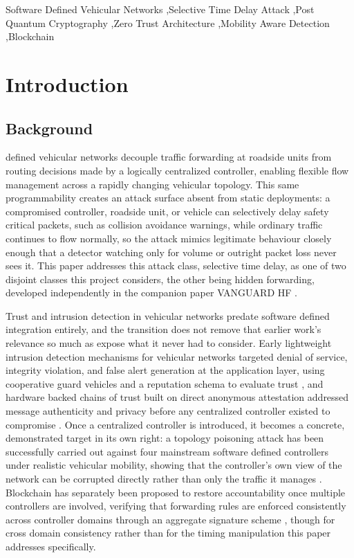 \documentclass[final,5p,twocolumn]{elsarticle}
\theoremstyle{remark}
\theoremstyle{plain}
\begin{document}
\begin{frontmatter}
\begin{keyword}
	Software Defined Vehicular Networks \sep Selective Time Delay Attack \sep Post Quantum Cryptography \sep Zero Trust Architecture \sep Mobility Aware Detection \sep Blockchain
\end{keyword}

\end{frontmatter}

\section{Introduction}\label{introduction}

\subsection{Background}

 defined vehicular networks decouple traffic forwarding at
roadside units from routing decisions made by a logically centralized
controller, enabling flexible flow management across a rapidly changing
vehicular topology. This same programmability creates an attack surface
absent from static deployments: a compromised controller, roadside unit,
or vehicle can selectively delay safety critical packets, such as
collision avoidance warnings, while ordinary traffic continues to flow
normally, so the attack mimics legitimate behaviour closely enough that a
detector watching only for volume or outright packet loss never sees it.
This paper addresses this attack class, selective time delay, as one of
two disjoint classes this project considers, the other being hidden
forwarding, developed independently in the companion paper VANGUARD HF
\cite{VanguardHF2026}.

Trust and intrusion detection in vehicular networks predate software
defined integration entirely, and the transition does not remove that
earlier work's relevance so much as expose what it never had to consider.
Early lightweight intrusion detection mechanisms for vehicular networks
targeted denial of service, integrity violation, and false alert
generation at the application layer, using cooperative guard vehicles and
a reputation schema to evaluate trust \cite{Sedjelmaci2014}, and hardware
backed chains of trust built on direct anonymous attestation addressed
message authenticity and privacy before any centralized controller existed
to compromise \cite{Sumra2011}. Once a centralized controller is
introduced, it becomes a concrete, demonstrated target in its own right: a
topology poisoning attack has been successfully carried out against four
mainstream software defined controllers under realistic vehicular
mobility, showing that the controller's own view of the network can be
corrupted directly rather than only the traffic it manages
\cite{Wang2020Topology}. Blockchain has separately been proposed to
restore accountability once multiple controllers are involved, verifying
that forwarding rules are enforced consistently across controller domains
through an aggregate signature scheme \cite{Li2022BlockREV}, though for
cross domain consistency rather than for the timing manipulation this
paper addresses specifically.
\end{document}
